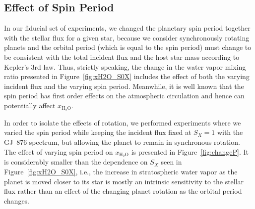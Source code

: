 \documentclass[11pt,numberedappendix,twocolappendix,]{emulateapj}
\def\water{H$_2$O}
\def\xwater{$x_\text{\water}$}
\def\wv{water vapor}
\newcommand{\yf}[1]{{\color{orange}#1}}
\begin{document}
\subsection{Effect of Spin Period}
\label{ss:sensitivity_Porbit}

In our fiducial set of experiments, we changed the planetary spin period together with the stellar flux for a given star, because we consider synchronously rotating planets and the orbital period (which is equal to the spin period) must change to be consistent with the total incident flux and the host star mass according to Kepler's 3rd law. 
Thus, strictly speaking, the change in the \wv{} mixing ratio presented in Figure~\ref{fig:xH2O_S0X} includes the effect of both the varying incident flux and the varying spin period. 
Meanwhile, it is well known that the spin period has first order effects on the atmospheric circulation and hence can potentially affect \xwater{}. 

In order to isolate the effects of rotation, we performed experiments where we varied the spin period while keeping the incident flux fixed at $S_X=1$ with the GJ~876 spectrum, but allowing the planet to remain in synchronous rotation. 
The effect of varying spin period on \xwater{} is presented in Figure~\ref{fig:changeP}. 
\yf{It is considerably smaller than the dependence on $S_X$ seen in Figure~\ref{fig:xH2O_S0X}, i.e., the increase in stratospheric water vapor as the planet is moved closer to its star is mostly an intrinsic sensitivity to the stellar flux rather than an effect of the changing planet rotation as the orbital period changes.} 
\end{document}
